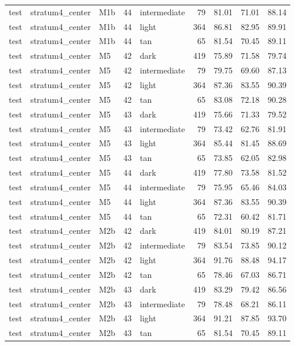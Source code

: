 \begin{tabular}{lllrlrrrr}
test & stratum4\_center & M1b & 44 & intermediate & 79 & 81.01 & 71.01 & 88.14 \\
test & stratum4\_center & M1b & 44 & light & 364 & 86.81 & 82.95 & 89.91 \\
test & stratum4\_center & M1b & 44 & tan & 65 & 81.54 & 70.45 & 89.11 \\
test & stratum4\_center & M5 & 42 & dark & 419 & 75.89 & 71.58 & 79.74 \\
test & stratum4\_center & M5 & 42 & intermediate & 79 & 79.75 & 69.60 & 87.13 \\
test & stratum4\_center & M5 & 42 & light & 364 & 87.36 & 83.55 & 90.39 \\
test & stratum4\_center & M5 & 42 & tan & 65 & 83.08 & 72.18 & 90.28 \\
test & stratum4\_center & M5 & 43 & dark & 419 & 75.66 & 71.33 & 79.52 \\
test & stratum4\_center & M5 & 43 & intermediate & 79 & 73.42 & 62.76 & 81.91 \\
test & stratum4\_center & M5 & 43 & light & 364 & 85.44 & 81.45 & 88.69 \\
test & stratum4\_center & M5 & 43 & tan & 65 & 73.85 & 62.05 & 82.98 \\
test & stratum4\_center & M5 & 44 & dark & 419 & 77.80 & 73.58 & 81.52 \\
test & stratum4\_center & M5 & 44 & intermediate & 79 & 75.95 & 65.46 & 84.03 \\
test & stratum4\_center & M5 & 44 & light & 364 & 87.36 & 83.55 & 90.39 \\
test & stratum4\_center & M5 & 44 & tan & 65 & 72.31 & 60.42 & 81.71 \\
test & stratum4\_center & M2b & 42 & dark & 419 & 84.01 & 80.19 & 87.21 \\
test & stratum4\_center & M2b & 42 & intermediate & 79 & 83.54 & 73.85 & 90.12 \\
test & stratum4\_center & M2b & 42 & light & 364 & 91.76 & 88.48 & 94.17 \\
test & stratum4\_center & M2b & 42 & tan & 65 & 78.46 & 67.03 & 86.71 \\
test & stratum4\_center & M2b & 43 & dark & 419 & 83.29 & 79.42 & 86.56 \\
test & stratum4\_center & M2b & 43 & intermediate & 79 & 78.48 & 68.21 & 86.11 \\
test & stratum4\_center & M2b & 43 & light & 364 & 91.21 & 87.85 & 93.70 \\
test & stratum4\_center & M2b & 43 & tan & 65 & 81.54 & 70.45 & 89.11 \\

\end{tabular}
